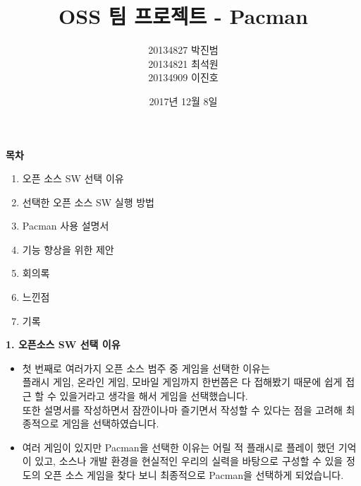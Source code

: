 \documentclass{article}
\begin{document}
 
\title{\textbf{OSS 팀 프로젝트 - Pacman}}

\author {20134827 박진범\\20134821 최석원\\20134909 이진호}
\date{2017년 12월 8일}
\maketitle
 
 
 
\newpage
\begin{huge}\begin{center}\textbf{목차\\}\end{center}\end{huge}
 
\begin{enumerate}

\item 오픈 소스 SW 선택 이유\\
\item 선택한 오픈 소스 SW 실행 방법\\
\item Pacman 사용 설명서\\
\item 기능 향상을 위한 제안\\
\item 회의록 \\
\item 느낀점 \\
\item 기록\\
 
\end{enumerate}

\newpage

\flushleft
\begin{large}\textbf{1. 오픈소스 SW 선택 이유}\end{large}
\begin{itemize}
 
\item 첫 번째로 여러가지 오픈 소스 범주 중 게임을 선택한 이유는\\ 
플래시 게임, 온라인 게임, 모바일 게임까지 한번쯤은 다 접해봤기 때문에 쉽게 접근 할 수 있을거라고 생각을 해서 게임을 선택했습니다. \\
또한 설명서를 작성하면서 잠깐이나마 즐기면서 작성할 수 있다는 점을 고려해 최종적으로 게임을 선택하였습니다.\\


\item 여러 게임이 있지만 Pacman을 선택한 이유는 어릴 적 플래시로 플레이 했던 기억이 있고, 소스나 개발 환경을 현실적인 우리의 실력을 바탕으로 구성할 수 있을 정도의 오픈 소스 게임을 찾다 보니 최종적으로 Pacman을 선택하게 되었습니다.\\
 
\end{itemize}
\end{document}
